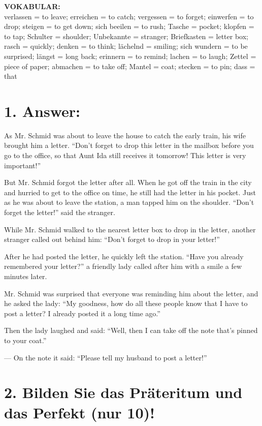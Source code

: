 \documentclass[12pt]{article}
\begin{document}
\textbf{VOKABULAR:} \\
verlassen = to leave; erreichen = to catch; vergessen = to forget; einwerfen = to drop; steigen = to get down; sich beeilen = to rush; Tasche = pocket; klopfen = to tap; Schulter = shoulder; Unbekannte = stranger; Briefkasten = letter box; rasch = quickly; denken = to think; lächelnd = smiling; sich wundern = to be surprised; längst = long back; erinnern = to remind; lachen = to laugh; Zettel = piece of paper; abmachen = to take off; Mantel = coat; stecken = to pin; dass = that

\section*{1. Answer:}

As Mr. Schmid was about to leave the house to catch the early train, his wife brought him a letter.  
“Don’t forget to drop this letter in the mailbox before you go to the office, so that Aunt Ida still receives it tomorrow! This letter is very important!”

But Mr. Schmid forgot the letter after all. When he got off the train in the city and hurried to get to the office on time, he still had the letter in his pocket. Just as he was about to leave the station, a man tapped him on the shoulder.  
“Don’t forget the letter!” said the stranger.  

While Mr. Schmid walked to the nearest letter box to drop in the letter, another stranger called out behind him:  
“Don’t forget to drop in your letter!”

After he had posted the letter, he quickly left the station.  
“Have you already remembered your letter?” a friendly lady called after him with a smile a few minutes later.

Mr. Schmid was surprised that everyone was reminding him about the letter, and he asked the lady:  
“My goodness, how do all these people know that I have to post a letter? I already posted it a long time ago.”

Then the lady laughed and said:  
“Well, then I can take off the note that’s pinned to your coat.”  

— On the note it said:  
“Please tell my husband to post a letter!”


\vspace{1em}

\section*{2. Bilden Sie das Präteritum und das Perfekt (nur 10)!}
\end{document}
